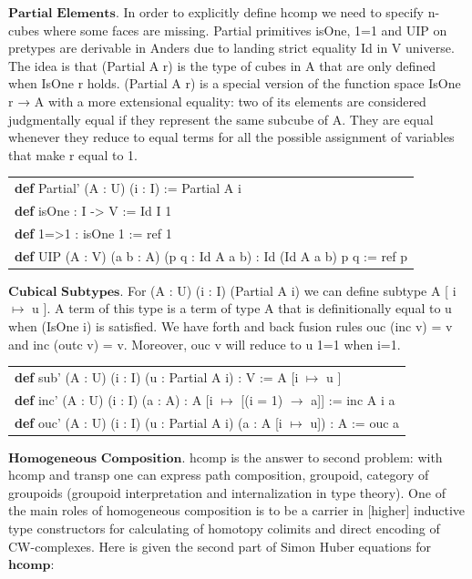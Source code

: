 \documentclass[a4paper,UKenglish,cleveref, autoref, thm-restate]{lipics-v2021}
\newcommand{\tabstyle}[0]{\scriptsize\ttfamily\fontseries{l}\selectfont}
\begin{document}
\newpage
$\textbf{Partial\ Elements}$. In order to explicitly define hcomp we need to specify
n-cubes where some faces are missing. Partial primitives isOne, 1=1 and UIP on pretypes
are derivable in Anders due to landing strict equality Id in V universe. The idea is
that (Partial A r) is the type of cubes in A that are only defined when IsOne r holds.
(Partial A r) is a special version of the function space IsOne r → A with a more
extensional equality: two of its elements are considered judgmentally equal if
they represent the same subcube of A. They are equal whenever they reduce to
equal terms for all the possible assignment of variables that make r equal to 1.

\begin{table}[ht!]
\tabstyle
\begin{tabular}{l}
\textbf{def} Partial' (A : U) (i : I) := Partial A i \\
\textbf{def} isOne : I -> V := Id I 1 \\
\textbf{def} 1=>1 : isOne 1 := ref 1 \\
\textbf{def} UIP (A : V) (a b : A) (p q : Id A a b) : Id (Id A a b) p q := ref p \\
\end{tabular}
\end{table}

$\textbf{Cubical\ Subtypes}$. For (A : U) (i : I) (Partial A i) we can define
subtype A [ i $\mapsto$ u ]. A term of this type is a term of type A that is
definitionally equal to u when (IsOne i) is satisfied. We have forth and back
fusion rules ouc (inc v) = v and inc (outc v) = v. Moreover, ouc v will reduce to u 1=1 when i=1.

\begin{table}[ht!]
\tabstyle
\begin{tabular}{l}
\textbf{def} sub' (A : U) (i : I) (u : Partial A i) : V := A [i $\mapsto$ u ] \\
\textbf{def} inc' (A : U) (i : I) (a : A) : A [i $\mapsto$ [(i = 1) $\rightarrow$ a]] := inc A i a \\
\textbf{def} ouc' (A : U) (i : I) (u : Partial A i) (a : A [i $\mapsto$ u]) : A := ouc a \\
\end{tabular}
\end{table}

$\textbf{Homogeneous\ Composition}$. hcomp is the answer to second problem: with hcomp and transp
one can express path composition, groupoid, category of groupoids (groupoid interpretation and
internalization in type theory). One of the main roles of homogeneous composition is to be a
carrier in [higher] inductive type constructors for calculating of homotopy colimits and direct
encoding of CW-complexes. Here is given the second part of Simon Huber equations \cite{Huber} for $\textbf{hcomp}$:
\end{document}
